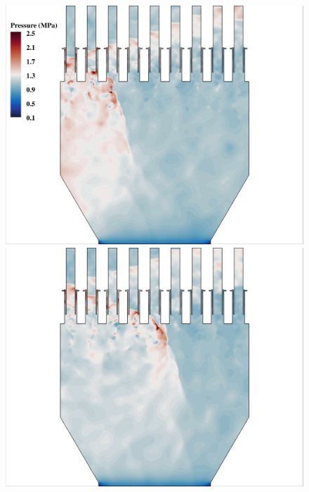 \begin{figure}
	\begin{minipage}{0.49\linewidth}
		\includegraphics[width=0.99\linewidth,trim={0.5em 0.5em 15em 0.5em},clip]{Chapters/HPROMResults/Images/nineElem/example_snaps/example_pressure_z.png}
	\end{minipage}
	\begin{minipage}{0.49\linewidth}
		\includegraphics[width=0.99\linewidth,trim={15em 0.5em 0.5em 0.5em},clip]{Chapters/HPROMResults/Images/nineElem/example_snaps/example_pressure_z_217000.png}
	\end{minipage}


\end{figure}
